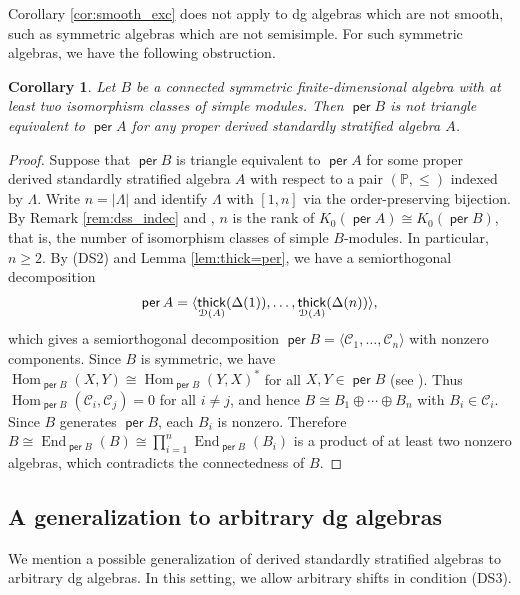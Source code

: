 \documentclass[a4paper,reqno,11pt]{amsart}
\numberwithin{equation}{section}
\newtheorem{corollary}[theorem]{Corollary}
\theoremstyle{definition}
\newcommand{\C}{\mathcal{C}}
\newcommand{\D}{\mathcal{D}}
\newcommand{\PP}{\mathbb{P}}
\newcommand{\bde}{\Delta}
\DeclareMathOperator{\thick}{\mathsf{thick}}
\DeclareMathOperator{\per}{\mathsf{per}}
\DeclareMathOperator{\End}{End}
\DeclareMathOperator{\Hom}{Hom}
\begin{document}
Corollary \ref{cor:smooth_exc} does not apply to dg algebras which are not smooth, such as symmetric algebras which are not semisimple.
For such symmetric algebras, we have the following obstruction.

\begin{corollary}\label{cor:symmetric}
Let $B$ be a connected symmetric finite-dimensional algebra with at least two isomorphism classes of simple modules.
Then $\per B$ is not triangle equivalent to $\per A$ for any proper derived standardly stratified algebra $A$.
\end{corollary}
\begin{proof}
Suppose that $\per B$ is triangle equivalent to $\per A$ for some proper derived standardly stratified algebra $A$ with respect to a pair $(\PP,\leq)$ indexed by $\Lambda$.
Write $n=|\Lambda|$ and identify $\Lambda$ with $[1,n]$ via the order-preserving bijection.
By Remark \ref{rem:dss_indec} and \cite[Theorem 2.27]{AI12}, $n$ is the rank of $K_{0}(\per A)\cong K_{0}(\per B)$, that is, the number of isomorphism classes of simple $B$-modules.
In particular, $n\geq 2$.
By (DS2) and Lemma \ref{lem:thick=per}, we have a semiorthogonal decomposition 
\begin{align}
\per A=\langle\thick_{\D(A)}(\bde(1)),\ldots,\thick_{\D(A)}(\bde(n))\rangle,\notag
\end{align}
which gives a semiorthogonal decomposition $\per B=\langle\C_{1},\ldots,\C_{n}\rangle$ with nonzero components.
Since $B$ is symmetric, we have $\Hom_{\per B}(X,Y)\cong\Hom_{\per B}(Y,X)^{\ast}$ for all $X,Y\in\per B$ (see \cite{H88}).
Thus $\Hom_{\per B}(\C_{i},\C_{j})=0$ for all $i\neq j$, and hence $B\cong B_{1}\oplus\cdots\oplus B_{n}$ with $B_{i}\in\C_{i}$.
Since $B$ generates $\per B$, each $B_{i}$ is nonzero.
Therefore $B\cong\End_{\per B}(B)\cong\prod_{i=1}^{n}\End_{\per B}(B_{i})$ is a product of at least two nonzero algebras, which contradicts the connectedness of $B$.
\end{proof}



\subsection{A generalization to arbitrary dg algebras}

We mention a possible generalization of derived standardly stratified algebras to arbitrary dg algebras.
In this setting, we allow arbitrary shifts in condition (DS3).
\end{document}
